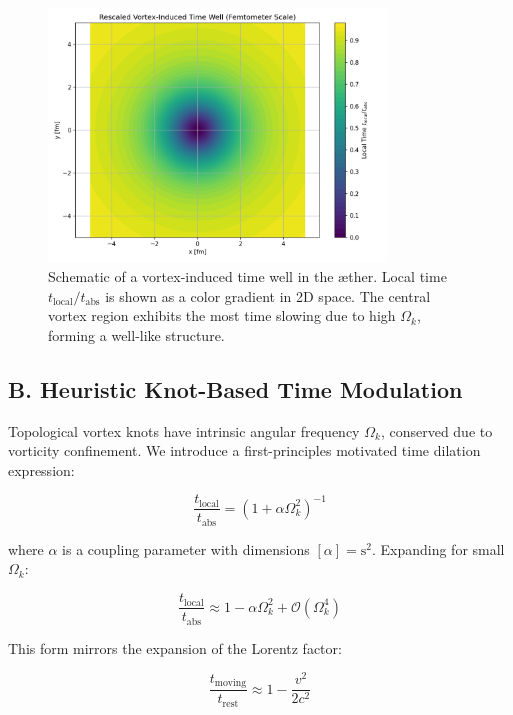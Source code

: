 \begin{figure}[h!]
    \centering
    \includegraphics[width=0.8\textwidth]{export/RadialProfileOfLocalTimeDilation_Vortex-Induced_Time_Well}
    \caption{Schematic of a vortex-induced time well in the æther. Local time $t_{\text{local}} / t_{\text{abs}}$ is shown as a color gradient in 2D space. The central vortex region exhibits the most time slowing due to high $\Omega_k$, forming a well-like structure.}
    \label{fig:vortex_time_well}
\end{figure}


\subsection*{B. Heuristic Knot-Based Time Modulation}

Topological vortex knots have intrinsic angular frequency $\Omega_k$, conserved due to vorticity confinement. We introduce a first-principles motivated time dilation expression:

\begin{equation}
\frac{t_{\text{local}}}{t_{\text{abs}}} = \left(1 + \alpha \Omega_k^2 \right)^{-1}
\end{equation}

where $\alpha$ is a coupling parameter with dimensions $[\alpha] = \text{s}^2$. Expanding for small $\Omega_k$:

\begin{equation}
\frac{t_{\text{local}}}{t_{\text{abs}}} \approx 1 - \alpha \Omega_k^2 + \mathcal{O}(\Omega_k^4)
\end{equation}

This form mirrors the expansion of the Lorentz factor:

\begin{equation}
\frac{t_{\text{moving}}}{t_{\text{rest}}} \approx 1 - \frac{v^2}{2 c^2}
\end{equation}

